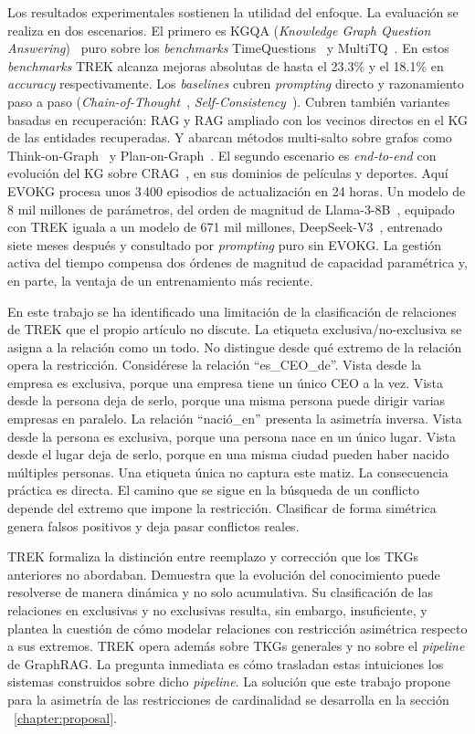 Los resultados experimentales sostienen la utilidad del enfoque. La evaluación se realiza en dos escenarios. El primero es KGQA (\emph{Knowledge Graph Question Answering})~\cite{kgqa_survey_placeholder} puro sobre los \emph{benchmarks} TimeQuestions~\cite{jia2021timeq} y MultiTQ~\cite{multitq_placeholder}. En estos \emph{benchmarks} TREK alcanza mejoras absolutas de hasta el 23.3\% y el 18.1\% en \emph{accuracy} respectivamente. Los \emph{baselines} cubren \emph{prompting} directo y razonamiento paso a paso (\emph{Chain-of-Thought}~\cite{wei2022cot}, \emph{Self-Consistency}~\cite{wang2023selfconsistency}). Cubren también variantes basadas en recuperación: RAG y RAG ampliado con los vecinos directos en el KG de las entidades recuperadas. Y abarcan métodos multi-salto sobre grafos como Think-on-Graph~\cite{sun2024tog} y Plan-on-Graph~\cite{luo2024pog}. El segundo escenario es \emph{end-to-end} con evolución del KG sobre CRAG~\cite{crag2024}, en sus dominios de películas y deportes. Aquí EVOKG procesa unos 3\,400 episodios de actualización en 24 horas. Un modelo de 8 mil millones de parámetros, del orden de magnitud de Llama-3-8B~\cite{llama3_2024}, equipado con TREK iguala a un modelo de 671 mil millones, DeepSeek-V3~\cite{deepseekv3_2025}, entrenado siete meses después y consultado por \emph{prompting} puro sin EVOKG. La gestión activa del tiempo compensa dos órdenes de magnitud de capacidad paramétrica y, en parte, la ventaja de un entrenamiento más reciente.

En este trabajo se ha identificado una limitación de la clasificación de relaciones de TREK que el propio artículo no discute. La etiqueta exclusiva/no-exclusiva se asigna a la relación como un todo. No distingue desde qué extremo de la relación opera la restricción. Considérese la relación ``es\_CEO\_de''. Vista desde la empresa es exclusiva, porque una empresa tiene un único CEO a la vez. Vista desde la persona deja de serlo, porque una misma persona puede dirigir varias empresas en paralelo. La relación ``nació\_en'' presenta la asimetría inversa. Vista desde la persona es exclusiva, porque una persona nace en un único lugar. Vista desde el lugar deja de serlo, porque en una misma ciudad pueden haber nacido múltiples personas. Una etiqueta única no captura este matiz. La consecuencia práctica es directa. El camino que se sigue en la búsqueda de un conflicto depende del extremo que impone la restricción. Clasificar de forma simétrica genera falsos positivos y deja pasar conflictos reales.

TREK formaliza la distinción entre reemplazo y corrección que los TKGs anteriores no abordaban. Demuestra que la evolución del conocimiento puede resolverse de manera dinámica y no solo acumulativa. Su clasificación de las relaciones en exclusivas y no exclusivas resulta, sin embargo, insuficiente, y plantea la cuestión de cómo modelar relaciones con restricción asimétrica respecto a sus extremos. TREK opera además sobre TKGs generales y no sobre el \emph{pipeline} de GraphRAG. La pregunta inmediata es cómo trasladan estas intuiciones los sistemas construidos sobre dicho \emph{pipeline}. La solución que este trabajo propone para la asimetría de las restricciones de cardinalidad se desarrolla en la sección ~\ref{chapter:proposal}.

